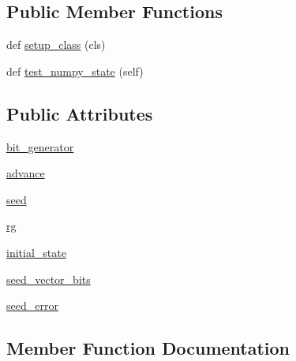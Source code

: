 \subsection*{Public Member Functions}
\begin{DoxyCompactItemize}
\item 
def \hyperlink{classnumpy_1_1random_1_1tests_1_1test__smoke_1_1TestMT19937_a362df61d24cc4a5d8fea382af361ff47}{setup\+\_\+class} (cls)
\item 
def \hyperlink{classnumpy_1_1random_1_1tests_1_1test__smoke_1_1TestMT19937_ac88f5c01b1209d2c58831462ba288647}{test\+\_\+numpy\+\_\+state} (self)
\end{DoxyCompactItemize}
\subsection*{Public Attributes}
\begin{DoxyCompactItemize}
\item 
\hyperlink{classnumpy_1_1random_1_1tests_1_1test__smoke_1_1TestMT19937_a14210636d8bc021942443b74bd49b821}{bit\+\_\+generator}
\item 
\hyperlink{classnumpy_1_1random_1_1tests_1_1test__smoke_1_1TestMT19937_a5b99da218d8cab71e93afaa7cadd9273}{advance}
\item 
\hyperlink{classnumpy_1_1random_1_1tests_1_1test__smoke_1_1TestMT19937_abe5e48c29d18896e189c37771728d401}{seed}
\item 
\hyperlink{classnumpy_1_1random_1_1tests_1_1test__smoke_1_1TestMT19937_ac71ba43119e5ddeebb86163781070b25}{rg}
\item 
\hyperlink{classnumpy_1_1random_1_1tests_1_1test__smoke_1_1TestMT19937_a2302a57e891635cf1eca19077aa6d027}{initial\+\_\+state}
\item 
\hyperlink{classnumpy_1_1random_1_1tests_1_1test__smoke_1_1TestMT19937_a9cd428bb84dcae3785c0e676fe27c1fc}{seed\+\_\+vector\+\_\+bits}
\item 
\hyperlink{classnumpy_1_1random_1_1tests_1_1test__smoke_1_1TestMT19937_ae3edd5e459cfb51354afcf4a9180e186}{seed\+\_\+error}
\end{DoxyCompactItemize}


\subsection{Member Function Documentation}
\mbox{\label{classnumpy_1_1random_1_1tests_1_1test__smoke_1_1TestMT19937_a362df61d24cc4a5d8fea382af361ff47}} 
